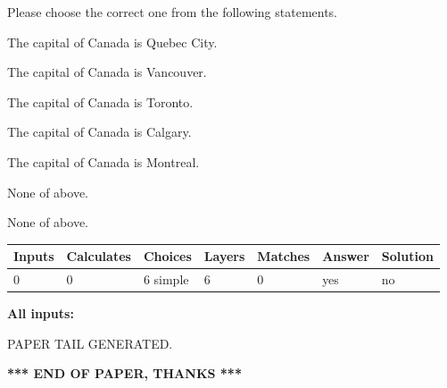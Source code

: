 \documentclass[12pt]{article}
\begin{document}
  
Please choose the correct one from the following statements.
 
 
The capital of Canada is Quebec City.
 
 
The capital of Canada is Vancouver.
 
 
The capital of Canada is Toronto.
 
 
The capital of Canada is Calgary.
 
 
The capital of Canada is Montreal.
 
 
 None of above.
 
 
\noindent{}
 
 
 None of above.
 
 
\noindent{}
 
 
   
   
   
   
\noindent\begin{tabular}{|l|l|l|l|l|l|l|}
 \hline
Inputs & Calculates & Choices & Layers & Matches & Answer & Solution \\ \hline
 0  & 
 0  & 
 6
  simple  
  & 
 6  & 
 0  & 
  yes & 
  no 
  \\ \hline
 \end{tabular}
   
   
   
   
\noindent{}
   
   
   
   
\noindent\vspace{0.1in}\hspace{-0.08in} {\textbf{\Large{All inputs: }}}
   
   
   
   
   
   
 \vspace{0.2in}
 
   
   
\vspace{2.0in} PAPER TAIL GENERATED.
   
   
   
   
\vspace{1.0in} 
{\textbf{\large{ *** END OF PAPER, THANKS *** }}} 
   
\end{document}
